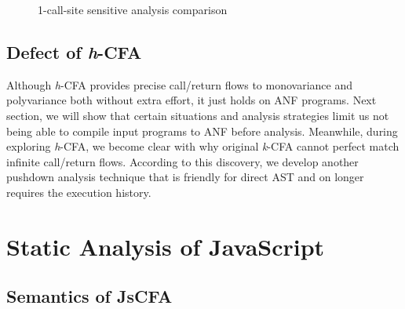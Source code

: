 \documentclass{article}
\begin{document}
\begin{figure}[h]
  \small
  \centering
{}
\caption{1-call-site sensitive analysis comparison}
\label{1-benchmark}
\end{figure}

\subsection{Defect of \textit{h}-CFA}
\label{sub:Defect of h-CFA}
Although \textit{h}-CFA provides precise call/return flows to monovariance and polyvariance both without extra effort, it just holds on ANF programs. Next section, we will show that certain situations and analysis strategies limit us not being able to compile input programs to ANF before analysis.
Meanwhile, during exploring \textit{h}-CFA, we become clear with why original \textit{k}-CFA cannot perfect match infinite call/return flows. According to this discovery, we develop another pushdown analysis technique that is friendly for direct AST and on longer requires the execution history.

\section{Static Analysis of JavaScript}
\label{sec:Static Analysis of JavaScript}

\subsection{Semantics of JsCFA}
\label{sub:Semantics of JsCFA}
\end{document}
